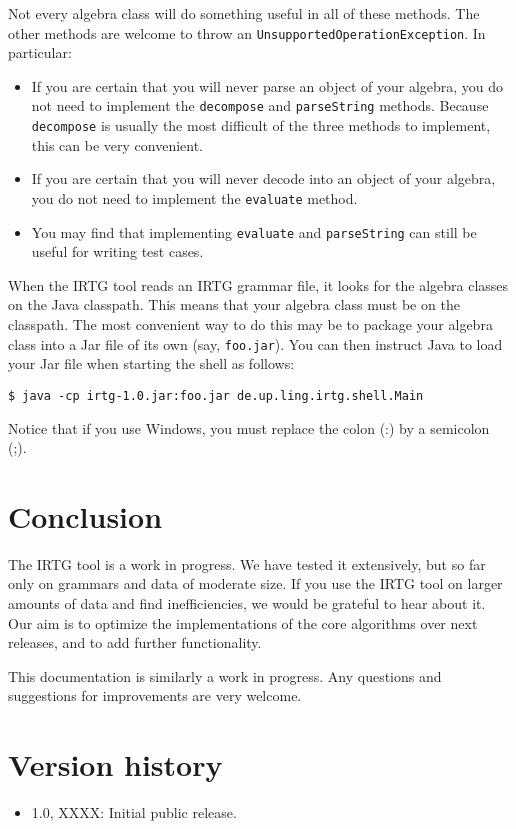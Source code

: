 \documentclass[11pt]{article}
\begin{document}
Not every algebra class will do something useful in all of these
methods. The other methods are welcome to throw an
\verb?UnsupportedOperationException?. In particular:

\begin{itemize}
\item If you are certain that you will never parse an object of your
  algebra, you do not need to implement the \verb?decompose? and
  \verb?parseString?  methods. Because \verb?decompose? is usually the
  most difficult of the three methods to implement, this can be very
  convenient.
\item If you are certain that you will never decode into an object of
  your algebra, you do not need to implement the \verb?evaluate?
  method.
\item You may find that implementing \verb?evaluate? and
  \verb?parseString? can still be useful for writing test cases.
\end{itemize}

When the IRTG tool reads an IRTG grammar file, it looks for the
algebra classes on the Java classpath. This means that your algebra
class must be on the classpath. The most convenient way to do this may
be to package your algebra class into a Jar file of its own (say,
\verb?foo.jar?). You can then instruct Java to load your Jar file when
starting the shell as follows:

\begin{verbatim}
$ java -cp irtg-1.0.jar:foo.jar de.up.ling.irtg.shell.Main
\end{verbatim}

Notice that if you use Windows, you must replace the colon (:) by a
semicolon (;).


\section{Conclusion} \label{sec:conclusion}

The IRTG tool is a work in progress. We have tested it extensively,
but so far only on grammars and data of moderate size. If you use the
IRTG tool on larger amounts of data and find inefficiencies, we would
be grateful to hear about it. Our aim is to optimize the
implementations of the core algorithms over next releases, and to add
further functionality.

This documentation is similarly a work in progress. Any questions and
suggestions for improvements are very welcome.


\section{Version history}

\begin{itemize}
\item 1.0, XXXX: Initial public release.
\end{itemize}




\end{document}
